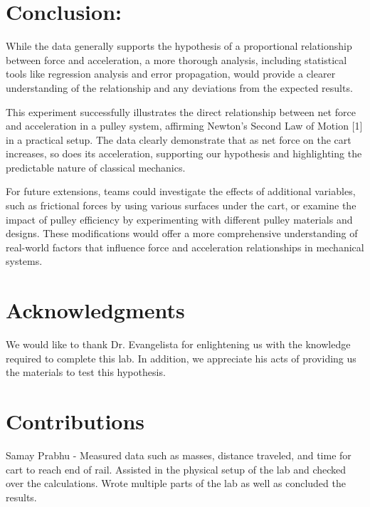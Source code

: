 ﻿\documentclass[reprint,amsmath,amssymb,aps]{revtex4-2}
\begin{document}
\section{Conclusion:}

While the data generally supports the hypothesis of a proportional relationship between force and acceleration, a more thorough analysis, including statistical tools like regression analysis and error propagation, would provide a clearer understanding of the relationship and any deviations from the expected results.

This experiment successfully illustrates the direct relationship between net force and acceleration in a pulley system, affirming Newton's Second Law of Motion [1] in a practical setup. The data clearly demonstrate that as net force on the cart increases, so does its acceleration, supporting our hypothesis and highlighting the predictable nature of classical mechanics.

For future extensions, teams could investigate the effects of additional variables, such as frictional forces by using various surfaces under the cart, or examine the impact of pulley efficiency by experimenting with different pulley materials and designs. These modifications would offer a more comprehensive understanding of real-world factors that influence force and acceleration relationships in mechanical systems.









\section{Acknowledgments}\label{sec:Acknowledgements}

We would like to thank Dr. Evangelista for enlightening us with the knowledge required to complete this lab. In addition, we appreciate his acts of providing us the materials to test this hypothesis.

\section{Contributions}\label{sec:Contributions}

Samay Prabhu - Measured data such as masses, distance traveled, and time for cart to reach end of rail. Assisted in the physical setup of the lab and checked over the calculations. Wrote multiple parts of the lab as well as concluded the results.
\end{document}
